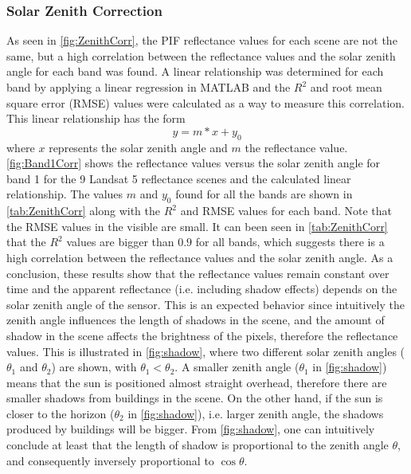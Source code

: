 \subsubsection{Solar Zenith Correction}

As seen in \autoref{fig:ZenithCorr}, the PIF reflectance values for each scene are not the same, but a high correlation between the reflectance values and the solar zenith angle for each band was found. A linear relationship was determined for each band by applying a linear regression in MATLAB and the $R^2$ and root mean square error (RMSE) values were calculated as a way to measure this correlation. This linear relationship has the form 
\begin{equation}
	y = m*x + y_0
	\label{eq:linear}
\end{equation}
where $x$ represents the solar zenith angle and $m$ the reflectance value. \autoref{fig:Band1Corr} shows the reflectance values versus the solar zenith angle for band 1 for the 9 Landsat 5 reflectance scenes and the calculated linear relationship. The values $m$ and $y_0$ found for all the bands are shown in \autoref{tab:ZenithCorr} along with the $R^2$ and RMSE values for each band. Note that the RMSE values in the visible are small. It can been seen in \autoref{tab:ZenithCorr} that the $R^2$ values are bigger than $0.9$ for all bands, which suggests there is a high correlation between the reflectance values and the solar zenith angle. As a conclusion, these results show that the reflectance values remain constant over time and the apparent reflectance (i.e. including shadow effects) depends on the solar zenith angle of the sensor. This is an expected behavior since intuitively the zenith angle influences the length of shadows in the scene, and the amount of shadow in the scene affects the brightness of the pixels, therefore the reflectance values. This is illustrated in \autoref{fig:shadow}, where two different solar zenith angles ($\theta_1$ and $\theta_2$) are shown, with $\theta_1<\theta_2$. A smaller zenith angle ($\theta_1$ in \autoref{fig:shadow}) means that the sun is positioned almost straight overhead, therefore there are smaller shadows from buildings in the scene. On the other hand, if the sun is closer to the horizon ($\theta_2$ in \autoref{fig:shadow}), i.e. larger zenith angle, the shadows produced by buildings will be bigger. From \autoref{fig:shadow}, one can intuitively conclude at least that the length of shadow is proportional to the zenith angle $\theta$, and consequently inversely proportional to $\cos{\theta}$.


